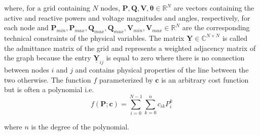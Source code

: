 \noindent where, for a grid containing $N$ nodes, $\boldsymbol{P}, \boldsymbol{Q}, \boldsymbol{V}, \boldsymbol{\theta} \in \mathbb{R}^N$ are vectors containing the
active and reactive powers and voltage magnitudes and angles, respectively, for each node and
$\boldsymbol{P}_{min}, \boldsymbol{P}_{max}, \boldsymbol{Q}_{max}, \boldsymbol{Q}_{max}, \boldsymbol{V}_{min}, \boldsymbol{V}_{max} \in \mathbb{R}^N$
are the corresponding technical constraints of the physical variables.
The matrix $\boldsymbol{\underline{Y}} \in \mathbb{C}^{N \times N}$ is called the admittance matrix
of the grid and represents a weighted adjacency matrix of the graph because the entry $\boldsymbol{\underline{Y}}_{ij}$ is equal
to zero where there is no connection between nodes $i$ and $j$ and contains physical properties of the line between the two otherwise.
The function $f$ parameterized by $\boldsymbol{c}$ is an arbitrary cost function but is often a polynomial i.e.
\[f(\boldsymbol{P}; \boldsymbol{c}) = \sum_{i=0}^{N - 1} \sum_{k=0}^n c_{ik}P_i^k\]

\noindent where $n$ is the degree of the polynomial.